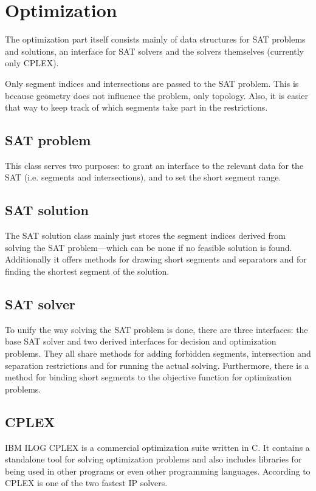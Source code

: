 \section{Optimization}
The optimization part itself consists mainly of data structures for
SAT problems and solutions, an interface for SAT solvers and the
solvers themselves (currently only CPLEX).

Only segment indices and intersections are passed to the SAT problem.
This is because geometry does not influence the problem, only
topology. Also, it is easier that way to keep track of which segments
take part in the restrictions.

\subsection{SAT problem}
This class serves two purposes: to grant an interface to the relevant
data for the SAT (i.e. segments and intersections), and to set the
short segment range.

\subsection{SAT solution}
The SAT solution class mainly just stores the segment indices derived
from solving the SAT problem---which can be none if no feasible
solution is found. Additionally it offers methods for drawing short
segments and separators and for finding the shortest segment of the
solution.

\subsection{SAT solver}
To unify the way solving the SAT problem is done, there are three
interfaces: the base SAT solver and two derived interfaces for
decision and optimization problems. They all share methods for adding
forbidden segments, intersection and separation restrictions and for
running the actual solving. Furthermore, there is a method for binding
short segments to the objective function for optimization problems.

\subsection{CPLEX}
\label{sec:cplex}
IBM ILOG CPLEX \cite{cplex}
is a commercial optimization suite written in C. It contains a
standalone tool for solving optimization problems and also includes
libraries for being used in other programs or even other programming
languages. According to \cite{cplex_benchmark}
CPLEX is one of the two fastest \gls{IP} solvers.

